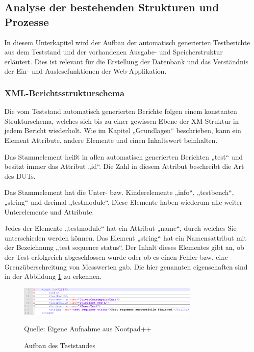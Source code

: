 \subsection{Analyse der bestehenden Strukturen und Prozesse}
\label{subsec:analyse-der-bestehenden-strukturen-und-prozesse}

In diesem Unterkapitel wird der Aufbau der automatisch
generierten Testberichte aus dem Teststand und der vorhandenen Ausgabe- und Speicherstruktur
erläutert. Dies ist relevant für die Erstellung der Datenbank und das
Verständnis der Ein- und Auslesefunktionen der Web-Applikation.

\subsubsection{XML-Berichtsstrukturschema}

Die vom Teststand automatisch generierten
Berichte folgen einem konstanten Strukturschema, welches sich bis zu einer
gewissen Ebene der XM-Struktur in jedem Bericht wiederholt. Wie im Kapitel „Grundlagen“
beschrieben, kann ein Element Attribute, andere Elemente und einen Inhaltswert beinhalten.

Das Stammelement heißt in allen automatisch
generierten Berichten „test“ und besitzt immer das Attribut „id“. Die Zahl in
diesem Attribut beschreibt die Art des \ac{DUTs}.

Das Stammelement hat die Unter- bzw.
Kinderelemente „info“, „testbench“, „string“ und dreimal „testmodule“. Diese
Elemente haben wiederum alle weiter Unterelemente und Attribute.

Jedes der Elemente „testmodule“ hat ein Attribut
„name“, durch welches Sie unterschieden werden können. Das Element „string“ hat
ein Namensattribut mit der Bezeichnung „test sequence status“. Der Inhalt
dieses Elementes gibt an, ob der Test erfolgreich abgeschlossen wurde oder ob
es einen Fehler bzw. eine Grenzüberschreitung von Messwerten gab.
Die hier genannten eigenschaften sind in der Abbildung \ref{fig:3. XML-Strukturbeispiel Kinder der Stammelementes} zu erkennen.

\begin{figure}[h]
    \centering
    \includegraphics[width=0.8\textwidth]{Grafiken/Obere_XML-Berichtstruktur(1)}
    \caption{Aufbau des Teststandes}
    \label{fig:3. XML-Strukturbeispiel Kinder der Stammelementes}
    {Quelle: Eigene Aufnahme aus Nootpad++}
\end{figure}


